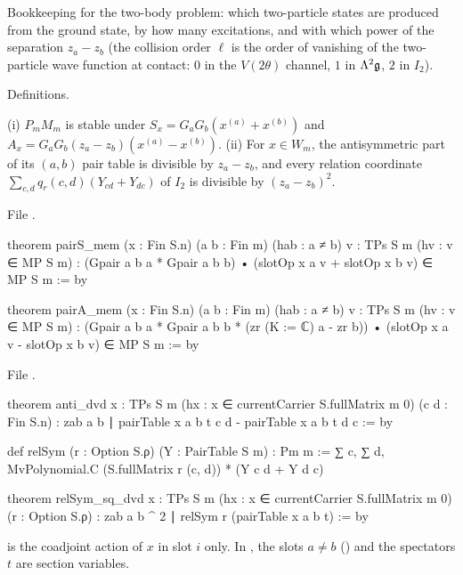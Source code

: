 \begin{physics}
Bookkeeping for the two-body problem: which two-particle states are produced from the ground state, by how many
excitations, and with which power of the separation $z_a-z_b$ (the collision order $\ell$ is the order of vanishing of the
two-particle wave function at contact: $0$ in the $V(2\theta)$ channel, $1$ in $\Lambda^2\mathfrak g$, $2$ in $I_2$).
\end{physics}

\begin{status}
Definitions.
\end{status}

\begin{theorem}\label{l24:thm:pairops}
(i) $P_mM_m$ is stable under $S_x=G_aG_b(x^{(a)}+x^{(b)})$ and $A_x=G_aG_b(z_a-z_b)(x^{(a)}-x^{(b)})$. (ii) For
$x\in W_m$, the antisymmetric part of its $(a,b)$ pair table is divisible by $z_a-z_b$, and every relation
coordinate $\sum_{c,d}q_r(c,d)(Y_{cd}+Y_{dc})$ of $I_2$ is divisible by $(z_a-z_b)^2$.
\end{theorem}
\noindent File .
\begin{leancode}
theorem pairS_mem (x : Fin S.n) (a b : Fin m) (hab : a ≠ b) {v : TPs S m} (hv : v ∈ MP S m) :
    (Gpair a b a * Gpair a b b) • (slotOp x a v + slotOp x b v) ∈ MP S m := by

theorem pairA_mem (x : Fin S.n) (a b : Fin m) (hab : a ≠ b) {v : TPs S m} (hv : v ∈ MP S m) :
    (Gpair a b a * Gpair a b b * (zr (K := ℂ) a - zr b)) • (slotOp x a v - slotOp x b v) ∈
      MP S m := by
\end{leancode}
\noindent File .
\begin{leancode}
theorem anti_dvd {x : TPs S m} (hx : x ∈ currentCarrier S.fullMatrix m 0) (c d : Fin S.n) :
    zab a b ∣ pairTable x a b t c d - pairTable x a b t d c := by

def relSym (r : Option S.ρ) (Y : PairTable S m) : Pm m :=
  ∑ c, ∑ d, MvPolynomial.C (S.fullMatrix r (c, d)) * (Y c d + Y d c)

theorem relSym_sq_dvd {x : TPs S m} (hx : x ∈ currentCarrier S.fullMatrix m 0)
    (r : Option S.ρ) : zab a b ^ 2 ∣ relSym r (pairTable x a b t) := by
\end{leancode}

\begin{dictionary}
 is the coadjoint action of $x$ in slot $i$ only. In ,  the
slots $a\neq b$ () and the spectators $t$ are section variables.
\end{dictionary}

